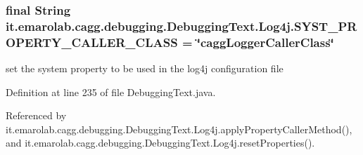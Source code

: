 \hypertarget{classit_1_1emarolab_1_1cagg_1_1debugging_1_1DebuggingText_1_1Log4j_a54d1c75011734466e3194aa53e33c6cf}{
\subsubsection[{S\-Y\-S\-T\-\_\-\-P\-R\-O\-P\-E\-R\-T\-Y\-\_\-\-C\-A\-L\-L\-E\-R\-\_\-\-C\-L\-A\-S\-S}]{\setlength{\rightskip}{0pt plus 5cm}final String it.\-emarolab.\-cagg.\-debugging.\-Debugging\-Text.\-Log4j.\-S\-Y\-S\-T\-\_\-\-P\-R\-O\-P\-E\-R\-T\-Y\-\_\-\-C\-A\-L\-L\-E\-R\-\_\-\-C\-L\-A\-S\-S = \char`\"{}cagg\-Logger\-Caller\-Class\char`\"{}\hspace{0.3cm}{\ttfamily [static]}}}\label{classit_1_1emarolab_1_1cagg_1_1debugging_1_1DebuggingText_1_1Log4j_a54d1c75011734466e3194aa53e33c6cf}


set the system property to be used in the log4j configuration file 



Definition at line 235 of file Debugging\-Text.\-java.



Referenced by it.\-emarolab.\-cagg.\-debugging.\-Debugging\-Text.\-Log4j.\-apply\-Property\-Caller\-Method(), and it.\-emarolab.\-cagg.\-debugging.\-Debugging\-Text.\-Log4j.\-reset\-Properties().


